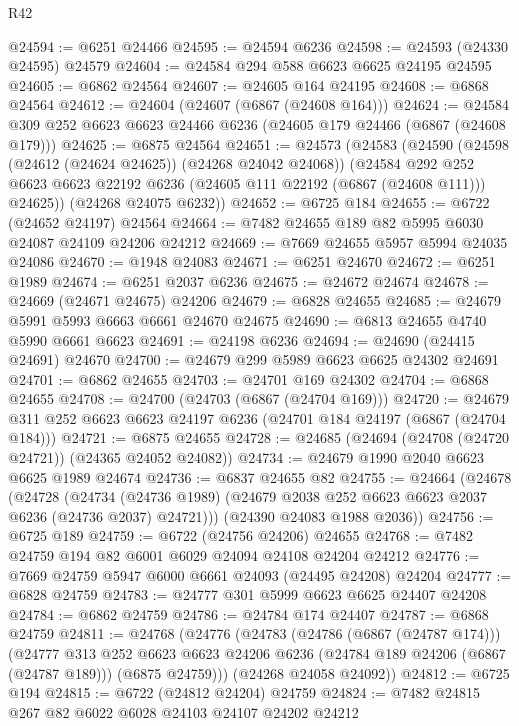 \begin{lexlean}{R42}
\begin{coremodule}
{@24594 := @6251 @24466
@24595 := @24594 @6236
@24598 := @24593 (@24330 @24595) @24579
@24604 := @24584 @294 @588 @6623 @6625 @24195 @24595
@24605 := @6862 @24564
@24607 := @24605 @164 @24195
@24608 := @6868 @24564
@24612 := @24604 (@24607 (@6867 (@24608 @164)))
@24624 := @24584 @309 @252 @6623 @6623 @24466 @6236 (@24605 @179 @24466 (@6867 (@24608 @179)))
@24625 := @6875 @24564
@24651 := @24573
    (@24583
      (@24590
        (@24598 (@24612 (@24624 @24625)) (@24268 @24042 @24068))
        (@24584
          @292
          @252
          @6623
          @6623
          @22192
          @6236
          (@24605 @111 @22192 (@6867 (@24608 @111)))
          @24625))
      (@24268 @24075 @6232))
@24652 := @6725 @184
@24655 := @6722 (@24652 @24197) @24564
@24664 := @7482 @24655 @189 @82 @5995 @6030 @24087 @24109 @24206 @24212
@24669 := @7669 @24655 @5957 @5994 @24035 @24086
@24670 := @1948 @24083
@24671 := @6251 @24670
@24672 := @6251 @1989
@24674 := @6251 @2037 @6236
@24675 := @24672 @24674
@24678 := @24669 (@24671 @24675) @24206
@24679 := @6828 @24655
@24685 := @24679 @5991 @5993 @6663 @6661 @24670 @24675
@24690 := @6813 @24655 @4740 @5990 @6661 @6623
@24691 := @24198 @6236
@24694 := @24690 (@24415 @24691) @24670
@24700 := @24679 @299 @5989 @6623 @6625 @24302 @24691
@24701 := @6862 @24655
@24703 := @24701 @169 @24302
@24704 := @6868 @24655
@24708 := @24700 (@24703 (@6867 (@24704 @169)))
@24720 := @24679 @311 @252 @6623 @6623 @24197 @6236 (@24701 @184 @24197 (@6867 (@24704 @184)))
@24721 := @6875 @24655
@24728 := @24685 (@24694 (@24708 (@24720 @24721)) (@24365 @24052 @24082))
@24734 := @24679 @1990 @2040 @6623 @6625 @1989 @24674
@24736 := @6837 @24655 @82
@24755 := @24664
    (@24678
      (@24728
        (@24734 (@24736 @1989) (@24679 @2038 @252 @6623 @6623 @2037 @6236 (@24736 @2037) @24721)))
      (@24390 @24083 @1988 @2036))
@24756 := @6725 @189
@24759 := @6722 (@24756 @24206) @24655
@24768 := @7482 @24759 @194 @82 @6001 @6029 @24094 @24108 @24204 @24212
@24776 := @7669 @24759 @5947 @6000 @6661 @24093 (@24495 @24208) @24204
@24777 := @6828 @24759
@24783 := @24777 @301 @5999 @6623 @6625 @24407 @24208
@24784 := @6862 @24759
@24786 := @24784 @174 @24407
@24787 := @6868 @24759
@24811 := @24768
    (@24776
      (@24783
        (@24786 (@6867 (@24787 @174)))
        (@24777
          @313
          @252
          @6623
          @6623
          @24206
          @6236
          (@24784 @189 @24206 (@6867 (@24787 @189)))
          (@6875 @24759)))
      (@24268 @24058 @24092))
@24812 := @6725 @194
@24815 := @6722 (@24812 @24204) @24759
@24824 := @7482 @24815 @267 @82 @6022 @6028 @24103 @24107 @24202 @24212
}
\end{coremodule}
\end{lexlean}
